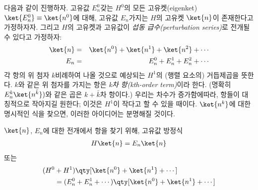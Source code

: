 다음과 같이 진행하자. 고유값 $E_n^0$\을 갖는 $H^0$의 모든 고유켓(eigenket) $\ket{E^0_n}\equiv \ket{n^0}$에 대해, 고유값 $E_n$\을 가지는 $H$의 고유켓 $\ket{n}$이 존재한다고 가정하자자. 그리고 $H$의 고유켓과 고유값이 \emph{섭동 급수(perturbation series)}로 전개될 수 있다고 가정하자:
\begin{eqnarray}
	\label{eq:17.1.1}
	\ket{n} &=& \ket{n^0} + \ket{n^1} + \ket{n^2} + \cdots\\
	E_n &=& E^0_n + E^1_n + E^2_n + \cdots \label{eq:17.1.2}
\end{eqnarray}
각 항의 위 첨자 $k$\는 비례하여 나올 것으로 예상되는 $H^1$의 (행렬 요소의) 거듭제곱을 뜻한다. $k$와 같은 위 첨자를 가지는 항은 \emph{k차 항(kth-order term)}이라 한다. (명확히 $E^k_n\ket{n^{\bar{k}}})$와 같은 곱은 $k+\bar{k}$차 항이다.) 우리는 차수가 증가함에따라, 항들이 대칭적으로 작아지길 원한다; 이것은 $H^1$이 작다고 할 수 있을 때이다. $\ket{n^k}$에 대한 명시적인 식을 찾으면, 이러한 아이디어는 분명해질 것이다.

$\ket{n}$, $E_n$에 대한 전개에서 항을 찾기 위해, 고유값 방정식
\begin{eqnarray}
	\label{eq:17.1.3}
	H\ket{n} = E_n \ket{n}
\end{eqnarray}
또는
\begin{equation}
	\begin{aligned}
		\label{eq:17.1.4}
		(H^0&+H^1)\qty[\ket{n^0} + \ket{n^1} + \cdots ]\\
		&= (E^0_n + E^1_n + \cdots)\qty[\ket{n^0} + \ket{n^1} + \cdots]
	\end{aligned}
\end{equation}

